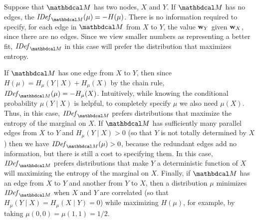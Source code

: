 \documentclass[the-pdg-manual.tex]{subfiles}
\begin{document}
	\begin{example}
	Suppose that $\dg M$ has two nodes, $X$ and $Y$. If $\dg M$ has no edges, the $\IDef{\dg M}(\mu) = - H(\mu)$.
	There is no information required to specify, for each edge in ${\dg M}$ from $X$ to $Y$, the value ${\mathbf w}_Y$ given ${\mathbf w}_X$, since there are no edges. Since we view smaller numbers as representing a better fit, $\IDef{\dg M}$ in this case will prefer the distribution that maximizes entropy.

	If $\dg M$ has one edge from $X$ to $Y$, then since $H(\mu) = H_{\mu}(Y \mid X) + H_\mu(X)$ by the chain rule, $\IDef{\dg M}(\mu) = -H_{\mu}(X)$. Intuitively, while knowing the conditional probability $\mu(Y \mid X)$ is helpful, to completely specify $\mu$ we also need $\mu(X)$. Thus, in this case, $\IDef{\dg M}$ prefers distributions that maximize the entropy of the marginal on $X$. If $\dg M$ has sufficiently many parallel edges
	from $X$ to $Y$ and $H_{\mu}(Y \mid X) > 0$ (so that $Y$ is not totally determined by $X$) then we have $\IDef{\dg M}(\mu) > 0$, because the redundant edges add no information, but there is still a cost to specifying them. In this case, $\IDef{\dg M}$ prefers distributions that make $Y$ a deterministic function of $X$ will maximizing the entropy of the marginal on $X$. Finally, if ${\dg M}$ has an edge from $X$ to $Y$ and another from $Y$
	to $X$, then a distribution $\mu$ minimizes $\IDef{\dg M}$ when 
	$X$ and $Y$ are correlated (so that $H_\mu(Y \mid X) = H_\mu(X \mid Y) = 0$) while
	maximizing $H(\mu)$, for example, by taking $\mu(0,0) = \mu(1,1) = 1/2$.
	\end{example}
\end{document}

